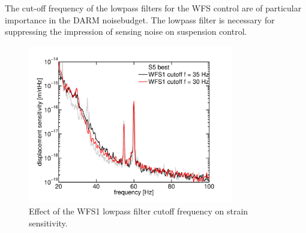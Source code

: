 The cut-off frequency of the lowpass filters for the WFS control are
of particular importance in the DARM noisebudget. The lowpass filter
is necessary for suppressing the impression of sensing noise on
suspension control. 

\begin{figure}
\begin{centering}
\includegraphics[width=0.8\textwidth]{figures/cutoffWFS1_DARM.pdf}
\caption{Effect of the WFS1 lowpass filter cutoff frequency on strain sensitivity.}
\label{fig:WFS1cutoff}
\end{centering}
\end{figure}


